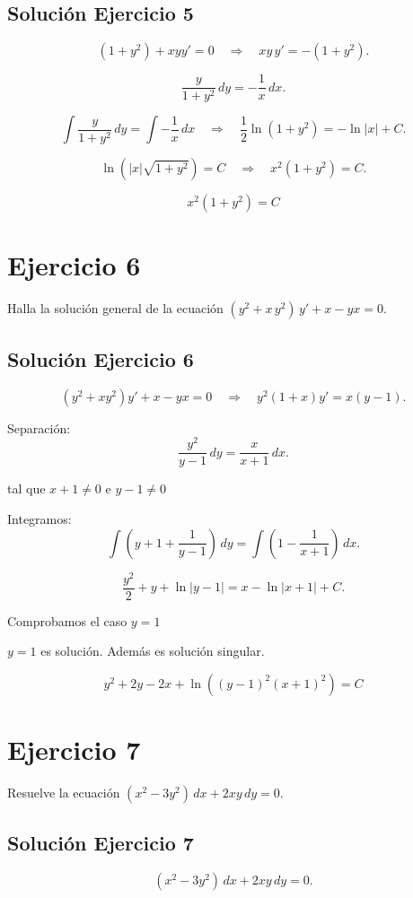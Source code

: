 \documentclass[12pt]{article}
\begin{document}
\subsection*{Solución Ejercicio 5}

\[
(1+y^2)+x y y'=0
\quad\Rightarrow\quad
x y \,y'=-(1+y^2).
\]

\[
\frac{y}{1+y^2}\,dy=-\frac{1}{x}\,dx.
\]

\[
\int \frac{y}{1+y^2}\,dy=\int -\frac{1}{x}\,dx
\quad\Rightarrow\quad
\frac12\ln(1+y^2)=-\ln|x|+C.
\]

\[
\ln\!\left(|x|\sqrt{1+y^2}\right)=C
\quad\Rightarrow\quad
x^2(1+y^2)=C.
\]

\[
\boxed{\,x^2(1+y^2)=C\,}
\]

\section*{Ejercicio 6}
Halla la solución general de la ecuación $(y^2 + x\,y^2)\,y' + x - yx = 0$.

\subsection*{Solución Ejercicio 6}

\[
(y^2+xy^2)y' + x-yx=0
\quad\Rightarrow\quad
y^2(1+x)y'=x(y-1).
\]

Separación:
\[
\frac{y^2}{y-1}\,dy=\frac{x}{x+1}\,dx.
\]

tal que $x + 1 \neq 0$ e $y - 1 \neq 0$

Integramos:
\[
\int\left(y+1+\frac{1}{y-1}\right)\,dy=\int\left(1-\frac{1}{x+1}\right)\,dx.
\]

\[
\frac{y^2}{2}+y+\ln|y-1|=x-\ln|x+1|+C.
\]

Comprobamos el caso $y = 1$

\(y=1\) es solución. Además es solución singular.

\[
\boxed{\,y^2+2y-2x+\ln((y-1)^2(x+1)^2)=C\,}
\]

\section*{Ejercicio 7}
Resuelve la ecuación $(x^2 - 3y^2)\,dx + 2xy\,dy = 0$.

\subsection*{Solución Ejercicio 7}

\[
(x^2-3y^2)\,dx+2xy\,dy=0.
\]
\end{document}
